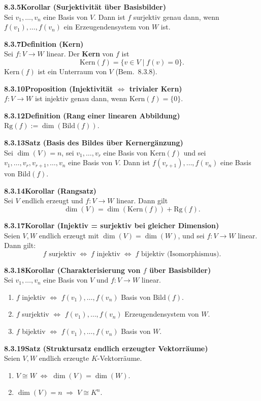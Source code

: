 \documentclass[a4paper,12pt]{article}
\newcommand{\gentry}[3]{%
  \noindent\textbf{#1\quad #2}\nopagebreak\\[0.2em]
  #3\par\smallskip
}
\begin{document}
\gentry{8.3.5}{Korollar (Surjektivität über Basisbilder)}{%
  Sei $v_1,\ldots,v_n$ eine Basis von $V$. Dann ist $f$ surjektiv genau dann,
  wenn $f(v_1),\ldots,f(v_n)$ ein Erzeugendensystem von $W$ ist.
}

\gentry{8.3.7}{Definition (Kern)}{%
  Sei $f: V \to W$ linear. Der \textbf{Kern} von $f$ ist
  \[
    \mathrm{Kern}(f) = \{v \in V \mid f(v) = 0\}.
  \]
  $\mathrm{Kern}(f)$ ist ein Unterraum von $V$ (Bem.~8.3.8).
}

\gentry{8.3.10}{Proposition (Injektivität $\Leftrightarrow$ trivialer Kern)}{%
  $f: V \to W$ ist injektiv genau dann, wenn $\mathrm{Kern}(f) = \{0\}$.
}

\gentry{8.3.12}{Definition (Rang einer linearen Abbildung)}{%
  $\mathrm{Rg}(f) := \dim(\mathrm{Bild}(f))$.
}

\gentry{8.3.13}{Satz (Basis des Bildes über Kernergänzung)}{%
  Sei $\dim(V) = n$, sei $v_1,\ldots,v_r$ eine Basis von $\mathrm{Kern}(f)$ und
  sei $v_1,\ldots,v_r,v_{r+1},\ldots,v_n$ eine Basis von $V$. Dann ist
  $f(v_{r+1}),\ldots,f(v_n)$ eine Basis von $\mathrm{Bild}(f)$.
}

\gentry{8.3.14}{Korollar (Rangsatz)}{%
  Sei $V$ endlich erzeugt und $f: V \to W$ linear. Dann gilt
  \[
    \dim(V) = \dim(\mathrm{Kern}(f)) + \mathrm{Rg}(f).
  \]
}

\gentry{8.3.17}{Korollar (Injektiv = surjektiv bei gleicher Dimension)}{%
  Seien $V, W$ endlich erzeugt mit $\dim(V) = \dim(W)$, und sei $f: V \to W$
  linear. Dann gilt:
  \[
    f \text{ surjektiv} \;\Longleftrightarrow\; f \text{ injektiv}
    \;\Longleftrightarrow\; f \text{ bijektiv (Isomorphismus)}.
  \]
}

\gentry{8.3.18}{Korollar (Charakterisierung von $f$ über Basisbilder)}{%
  Sei $v_1,\ldots,v_n$ eine Basis von $V$ und $f: V \to W$ linear.
  \begin{enumerate}[label=(\alph*),topsep=2pt,itemsep=1pt]
    \item $f$ injektiv $\Leftrightarrow$ $f(v_1),\ldots,f(v_n)$ Basis von $\mathrm{Bild}(f)$.
    \item $f$ surjektiv $\Leftrightarrow$ $f(v_1),\ldots,f(v_n)$ Erzeugendensystem von $W$.
    \item $f$ bijektiv $\Leftrightarrow$ $f(v_1),\ldots,f(v_n)$ Basis von $W$.
  \end{enumerate}
}

\gentry{8.3.19}{Satz (Struktursatz endlich erzeugter Vektorräume)}{%
  Seien $V, W$ endlich erzeugte $K$-Vektorräume.
  \begin{enumerate}[label=(\alph*),topsep=2pt,itemsep=1pt]
    \item $V \cong W \;\Leftrightarrow\; \dim(V) = \dim(W)$.
    \item $\dim(V) = n \;\Rightarrow\; V \cong K^n$.
  \end{enumerate}
}
\end{document}
